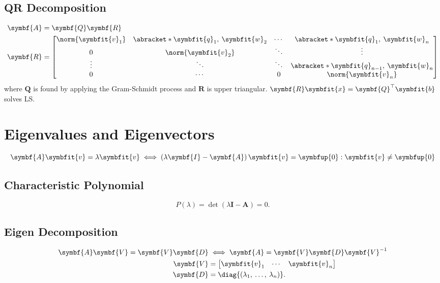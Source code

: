 \documentclass{article}
\begin{document}
\begin{multicols*}{3}
    \subsection{QR Decomposition}
    \begin{align*}
        \symbf{A} & = \symbf{Q} \symbf{R}                                                                                                    \\
        \symbf{R} & = \begin{bmatrix}
                          \norm{\symbfit{v}_1} & \abracket*{\symbfit{q}_1,\: \symbfit{w}_2} & \cdots & \abracket*{\symbfit{q}_1,\: \symbfit{w}_n}       \\
                          0                    & \norm{\symbfit{v}_2}              & \ddots & \vdots                                  \\
                          \vdots               & \ddots                            & \ddots & \abracket*{\symbfit{q}_{n - 1},\: \symbfit{w}_n} \\
                          0                    & \cdots                            & 0      & \norm{\symbfit{v}_n}
                      \end{bmatrix}
    \end{align*}
    where \(\symbf{Q}\) is found by applying the Gram-Schmidt process and \(\symbf{R}\) is upper triangular. \(\symbf{R} \symbfit{x} = \symbf{Q}^\top \symbfit{b}\) solves LS\@.
    \section{Eigenvalues and Eigenvectors}
    \begin{equation*}
        \symbf{A} \symbfit{v} = \lambda \symbfit{v} \iff \left( \lambda \symbf{I} - \symbf{A} \right) \symbfit{v} = \symbfup{0} : \symbfit{v} \neq \symbfup{0}
    \end{equation*}
    \subsection{Characteristic Polynomial}
    \begin{equation*}
        P\left( \lambda \right) = \det{\left( \lambda \symbf{I} - \symbf{A} \right)} = 0.
    \end{equation*}
    \subsection{Eigen Decomposition}
    \begin{align*}
        \symbf{A} \symbf{V} = \symbf{V} \symbf{D}
                  & \iff
        \symbf{A} = \symbf{V} \symbf{D} \symbf{V}^{-1}                       \\
        \symbf{V} & = \begin{bmatrix}
                          \symbfit{v}_1 & \cdots & \symbfit{v}_n
                      \end{bmatrix}                 \\
        \symbf{D} & = \diag{\left( \lambda_1,\: \dots,\: \lambda_n \right)}.
    \end{align*}

\end{multicols*}
\end{document}
